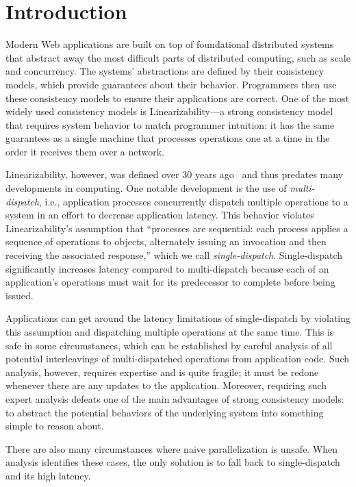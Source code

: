 \section{Introduction}
\label{sec:intro}
Modern Web applications are built on top of foundational distributed systems that abstract away
the most difficult parts of distributed computing, such as scale and concurrency.
The systems' abstractions are defined by their consistency models, which provide guarantees about their behavior. Programmers then use these consistency models to ensure their applications are correct.
One of the most widely used consistency models is Linearizability---a strong consistency model that requires system behavior to match programmer intuition:
it has the same guarantees as a single machine that processes operations
one at a time in the order it receives them over a network.

Linearizability, however, was defined over 30 years ago~\cite{herlihy1990linearizability,herlihy1987linearizability} and thus predates many developments in computing.
One notable development is the use of \textit{multi-dispatch}, i.e., application processes concurrently dispatch multiple operations to a system in an effort to
decrease application latency.
This behavior violates Linearizability's assumption that  
``processes are sequential: each process applies a sequence
of operations to objects, alternately issuing an invocation and then receiving the associated response,'' which we call \textit{single-dispatch}.
Single-dispatch significantly increases latency compared to multi-dispatch because each of an application's operations must wait for its predecessor to complete before being issued.

Applications can get around the latency limitations of single-dispatch by violating this assumption and dispatching multiple operations at the same time.
This is safe in some circumstances, which can be established by careful analysis of all potential interleavings of multi-dispatched operations from application code.
Such analysis, however, requires expertise and is quite fragile; it must be redone whenever there are any updates to the application.
Moreover, requiring such expert analysis defeats one of the main advantages of strong consistency models:
to abstract the potential behaviors of the underlying system into something simple to reason about.

There are also many circumstances where naive parallelization is unsafe. When analysis identifies these cases, the only solution is to fall back to single-dispatch and its high latency.

